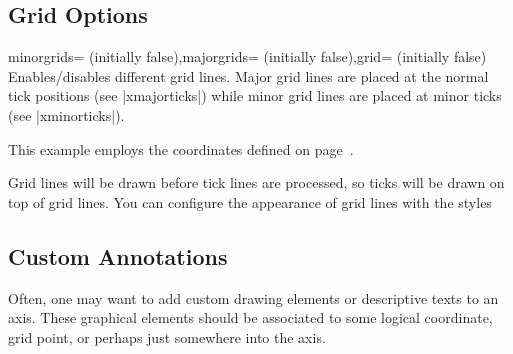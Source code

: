 


\subsection{Grid Options}
	
\begin{pgfplotsxykeylist}{\x minorgrids= (initially false),\x majorgrids= (initially false),grid= (initially false)}
Enables/disables different grid lines. Major grid lines are placed at the normal tick positions (see |xmajorticks|) while minor grid lines are placed at minor ticks (see |xminorticks|). 

This example employs the coordinates defined on page~\pageref{page:plotcoords:src}.
\begin{codeexample}[]
\begin{tikzpicture}
\begin{loglogaxis}[
	xlabel={\textsc{Dof}},
	ylabel={$L_2$ Error},
	grid=major
]
\plotcoords
\end{loglogaxis}
\end{tikzpicture}
\end{codeexample}

\begin{codeexample}[]
\end{codeexample}

Grid lines will be drawn before tick lines are processed, so ticks will be drawn on top of grid lines. You can configure the appearance of grid lines with the styles
\begin{codeexample}
\end{codeexample}
\end{pgfplotsxykeylist}


\subsection{Custom Annotations}
Often, one may want to add custom drawing elements or descriptive texts to an axis. These graphical elements should be associated to some logical coordinate, grid point, or perhaps just somewhere into the axis.

